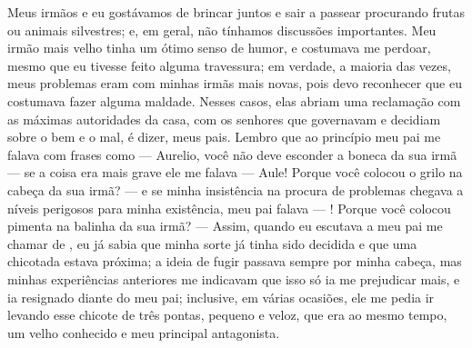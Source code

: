 Meus irmãos e eu gostávamos de brincar juntos e sair a passear procurando frutas ou animais silvestres; e, em geral, não tínhamos discussões importantes. Meu irmão mais velho tinha um ótimo senso de humor, e costumava me perdoar, mesmo que eu tivesse feito alguma travessura; em verdade, a maioria das vezes, meus problemas eram com minhas irmãs mais novas, pois devo reconhecer que eu costumava fazer alguma maldade.
Nesses casos, elas abriam uma reclamação com as máximas autoridades da casa, com os senhores que governavam e decidiam sobre o bem e o mal, é dizer, meus pais. Lembro que ao princípio meu pai me falava com frases como --- Aurelio, você não deve esconder a boneca da sua irmã --- se a coisa era mais grave ele me falava --- Aule! Porque você colocou o grilo na cabeça da sua irmã? --- e se minha insistência na procura de problemas chegava a níveis perigosos para minha existência, meu pai falava --- \Aulicha! Porque você colocou pimenta na balinha da sua irmã? ---
Assim, quando eu escutava a meu pai me chamar de \Aulicha, eu já sabia que minha sorte já tinha sido decidida e que uma chicotada estava próxima; a ideia de fugir passava sempre por minha cabeça, mas minhas experiências anteriores me indicavam que isso só ia me prejudicar mais, e ia resignado diante do meu pai; inclusive, em várias ocasiões, ele me pedia ir levando esse chicote de três pontas, pequeno e veloz, que era ao mesmo tempo, um velho conhecido e meu principal antagonista.




